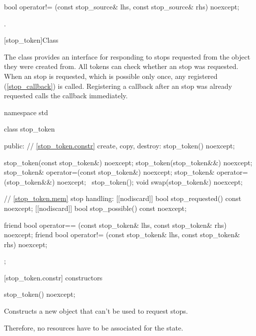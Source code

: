 {%
\begin{itemdecl}
bool operator!= (const stop_source& lhs, const stop_source& rhs) noexcept;
\end{itemdecl}
\begin{itemdescr}
  \pnum\returns {}.
\end{itemdescr}


%
[stop_token]{Class }

\pnum
{}%
The class  provides an interface for responding to stops requested from
the  object they were created from.
All tokens can check whether an stop was requested.
When an stop is requested, which is possible only once,
any registered  (\ref{stop_callback}) is called.
Registering a callback after an stop was already requested calls the callback immediately.

\begin{codeblock}
namespace std {
  class stop_token {
  public:
    // \ref{stop_token.constr} create, copy, destroy:
    stop_token() noexcept;

    stop_token(const stop_token&) noexcept;
    stop_token(stop_token&&) noexcept;
    stop_token& operator=(const stop_token&) noexcept;
    stop_token& operator=(stop_token&&) noexcept;
    ~stop_token();
    void swap(stop_token&) noexcept;

    // \ref{stop_token.mem} stop handling:
    [[nodiscard]] bool stop_requested() const noexcept;
    [[nodiscard]] bool stop_possible() const noexcept;

    friend bool operator== (const stop_token& lhs, const stop_token& rhs) noexcept;
    friend bool operator!= (const stop_token& lhs, const stop_token& rhs) noexcept;
  };
}
\end{codeblock}


[stop_token.constr]{ constructors}

%
\begin{itemdecl}
stop_token() noexcept;
\end{itemdecl}
\begin{itemdescr}
  \pnum\effects Constructs a new  object that can't be used to request stops.
                \begin{note} Therefore, no resources have to be associated for the state.  \end{note}


\end{itemdescr}}
